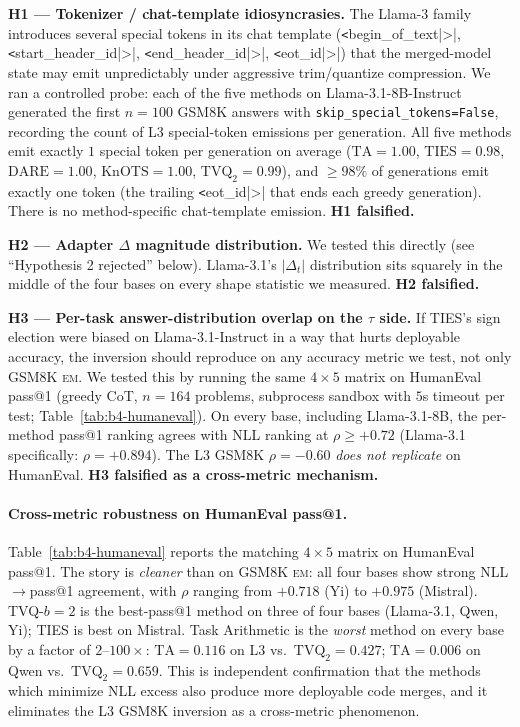 \textbf{H1 --- Tokenizer / chat-template idiosyncrasies.} The
Llama-3 family introduces several special tokens in its chat
template (\verb|<|begin_of_text|>|,
\verb|<|start_header_id|>|, \verb|<|end_header_id|>|,
\verb|<|eot_id|>|) that the merged-model state may emit
unpredictably under aggressive trim/quantize compression.
We ran a controlled probe: each of the five methods on
Llama-3.1-8B-Instruct generated the first $n=100$ GSM8K answers
with \verb|skip_special_tokens=False|, recording the count of
L3 special-token emissions per generation. All five methods
emit exactly $1$ special token per generation on average
($\mathrm{TA}{=}1.00$, $\mathrm{TIES}{=}0.98$,
$\mathrm{DARE}{=}1.00$, $\mathrm{KnOTS}{=}1.00$,
$\mathrm{TVQ}_2{=}0.99$), and $\geq 98\%$ of generations emit
exactly one token (the trailing \verb|<|eot_id|>| that ends each
greedy generation). There is no method-specific chat-template
emission. \textbf{H1 falsified.}

\textbf{H2 --- Adapter $\Delta$ magnitude distribution.} We
tested this directly (see ``Hypothesis 2 rejected'' below).
Llama-3.1's $|\Delta_t|$ distribution sits squarely in the
middle of the four bases on every shape statistic we measured.
\textbf{H2 falsified.}

\textbf{H3 --- Per-task answer-distribution overlap on the
$\tau$ side.} If TIES's sign election were biased on
Llama-3.1-Instruct in a way that hurts deployable accuracy,
the inversion should reproduce on any accuracy metric we test,
not only GSM8K \textsc{em}. We tested this by running the same
$4 \times 5$ matrix on HumanEval pass@1 (greedy CoT, $n = 164$
problems, subprocess sandbox with $5$s timeout per test;
Table~\ref{tab:b4-humaneval}). On every base, including
Llama-3.1-8B, the per-method pass@1 ranking agrees with NLL
ranking at $\rho \geq +0.72$ (Llama-3.1 specifically:
$\rho = +0.894$). The L3 GSM8K $\rho = -0.60$ \emph{does not
replicate} on HumanEval. \textbf{H3 falsified as a
cross-metric mechanism.}

\paragraph{Cross-metric robustness on HumanEval pass@1.}
Table~\ref{tab:b4-humaneval} reports the matching $4 \times 5$
matrix on HumanEval pass@1. The story is
\emph{cleaner} than on GSM8K \textsc{em}: all four bases show
strong NLL$\to$pass@1 agreement, with $\rho$ ranging from
$+0.718$ (Yi) to $+0.975$ (Mistral). TVQ-$b{=}2$ is the
best-pass@1 method on three of four bases (Llama-3.1, Qwen,
Yi); TIES is best on Mistral. Task Arithmetic is the
\emph{worst} method on every base by a factor of $2$--$100\times$:
$\mathrm{TA} = 0.116$ on L3 vs.\ $\mathrm{TVQ}_2 = 0.427$;
$\mathrm{TA} = 0.006$ on Qwen vs.\ $\mathrm{TVQ}_2 = 0.659$.
This is independent confirmation that the methods which
minimize NLL excess also produce more deployable code merges,
and it eliminates the L3 GSM8K inversion as a cross-metric
phenomenon.

